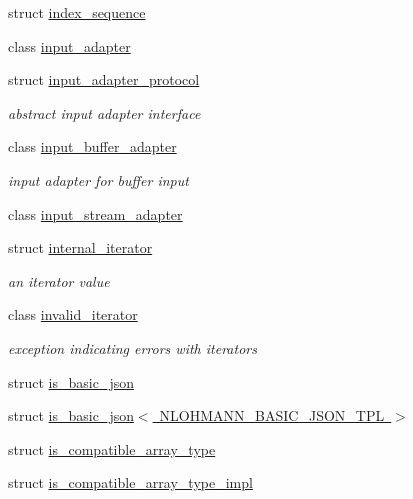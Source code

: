 \begin{DoxyCompactItemize}
struct \mbox{\hyperlink{structnlohmann_1_1detail_1_1index__sequence}{index\+\_\+sequence}}
\item 
class \mbox{\hyperlink{classnlohmann_1_1detail_1_1input__adapter}{input\+\_\+adapter}}
\item 
struct \mbox{\hyperlink{structnlohmann_1_1detail_1_1input__adapter__protocol}{input\+\_\+adapter\+\_\+protocol}}
\begin{DoxyCompactList}\small\item\em abstract input adapter interface \end{DoxyCompactList}\item 
class \mbox{\hyperlink{classnlohmann_1_1detail_1_1input__buffer__adapter}{input\+\_\+buffer\+\_\+adapter}}
\begin{DoxyCompactList}\small\item\em input adapter for buffer input \end{DoxyCompactList}\item 
class \mbox{\hyperlink{classnlohmann_1_1detail_1_1input__stream__adapter}{input\+\_\+stream\+\_\+adapter}}
\item 
struct \mbox{\hyperlink{structnlohmann_1_1detail_1_1internal__iterator}{internal\+\_\+iterator}}
\begin{DoxyCompactList}\small\item\em an iterator value \end{DoxyCompactList}\item 
class \mbox{\hyperlink{classnlohmann_1_1detail_1_1invalid__iterator}{invalid\+\_\+iterator}}
\begin{DoxyCompactList}\small\item\em exception indicating errors with iterators \end{DoxyCompactList}\item 
struct \mbox{\hyperlink{structnlohmann_1_1detail_1_1is__basic__json}{is\+\_\+basic\+\_\+json}}
\item 
struct \mbox{\hyperlink{structnlohmann_1_1detail_1_1is__basic__json_3_01_n_l_o_h_m_a_n_n___b_a_s_i_c___j_s_o_n___t_p_l_01_4}{is\+\_\+basic\+\_\+json$<$ N\+L\+O\+H\+M\+A\+N\+N\+\_\+\+B\+A\+S\+I\+C\+\_\+\+J\+S\+O\+N\+\_\+\+T\+P\+L $>$}}
\item 
struct \mbox{\hyperlink{structnlohmann_1_1detail_1_1is__compatible__array__type}{is\+\_\+compatible\+\_\+array\+\_\+type}}
\item 
struct \mbox{\hyperlink{structnlohmann_1_1detail_1_1is__compatible__array__type__impl}{is\+\_\+compatible\+\_\+array\+\_\+type\+\_\+impl}}
\item 

\end{DoxyCompactItemize}
